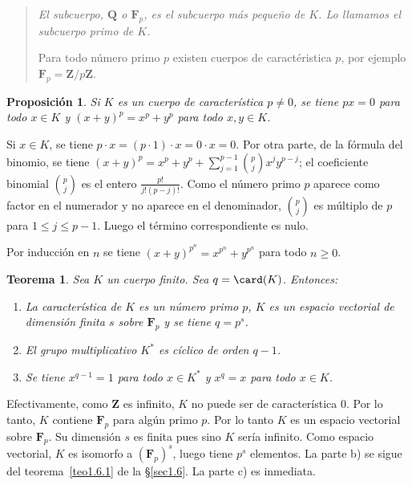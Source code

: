 \documentclass[bibtotoc,leqno,spanish]{amsbook}
\newcommand{\QQ}{\mathbf{Q}}
\newcommand{\ZZ}{\mathbf{Z}}
\newcommand{\FF}{\mathbf{F}}
\numberwithin{equation}{section}
\newenvironment{comm}%
	{\begin{quotation}\itshape\Small}
	{\end{quotation}}
\theoremstyle{note}
\theoremstyle{note}
\newtheorem{theorem}{Teorema}
\newtheorem{proposition}{Proposici\'on}
\theoremstyle{rem}
\numberwithin{theorem}{section}
\numberwithin{proposition}{section}
\numberwithin{definition}{section}
\numberwithin{lemma}{section}
\numberwithin{corollary}{section}
\numberwithin{example}{section}
\numberwithin{footnote}{section}%
\begin{document}
\begin{comm}
El subcuerpo, $\QQ$ o $\FF_{p}$, es el subcuerpo m\'as
peque\~no de $K$. Lo llamamos el {\em subcuerpo primo} de $K$.

Para todo n\'umero primo $p$ existen cuerpos de caract\'eristica $p$,
por ejemplo $\FF_{p} = \ZZ/p\ZZ$.
\end{comm}

\begin{proposition}\label{prop1.7.1}
Si $K$ es un cuerpo de caracter\'istica $p\neq 0$, se tiene
$px = 0$ para todo $x\in K$ y $(x+y)^{p} = x^{p}+y^{p}$ para
todo $x, y\in K$.
\end{proposition}

Si $x\in K$, se tiene $p\cdot x = (p\cdot 1)\cdot x = 0\cdot x = 0$. Por otra parte,
de la f\'ormula del binomio, se tiene $(x+y)^{p} = x^{p}+y^{p}+\sum_{j=1}^{p-1}\binom{p}{j}x^{j}y^{p-j}$;
el coeficiente binomial $\binom{p}{j}$ es el entero $\frac{p!}{j!(p-j)!}$. Como el n\'umero primo
$p$ aparece como factor en el numerador y no aparece en el denominador, $\binom{p}{j}$ es m\'ultiplo
de $p$ para $1\leq j\leq p-1$. Luego el t\'ermino correspondiente es nulo.

Por inducci\'on en $n$ se tiene $(x+y)^{p^{n}}=x^{p^{n}}+y^{p^{n}}$ para todo $n\geq 0$.

\begin{theorem}\label{teo1.7.1}
Sea $K$ un cuerpo finito. Sea $q = \card(K)$. Entonces:
\begin{enumerate}%
\item[a)] La caracter\'istica de $K$ es un n\'umero primo $p$, $K$ es un espacio vectorial de
dimensi\'on finita $s$ sobre $\FF_{p}$ y se tiene $q = p^{s}$.
\item[b)] El grupo multiplicativo $K^{*}$ es c\'iclico de orden $q-1$.
\item[c)] Se tiene $x^{q-1} = 1$ para todo $x\in K^{*}$ y $x^{q} = x$ para todo $x\in K$.
\end{enumerate}
\end{theorem}

Efectivamente, como $\ZZ$ es infinito, $K$ no puede ser de caracter\'istica $0$. Por lo tanto,
$K$ contiene $\FF_{p}$ para alg\'un primo $p$. Por lo tanto $K$ es un espacio vectorial sobre
$\FF_{p}$. Su dimensi\'on $s$ es finita pues sino $K$ ser\'ia infinito. Como espacio vectorial,
$K$ es isomorfo a $(\FF_{p})^{s}$, luego tiene $p^{s}$ elementos. La parte b) se sigue del
teorema~\ref{teo1.6.1} de la \S\ref{sec1.6}. La parte c) es inmediata.
\end{document}
